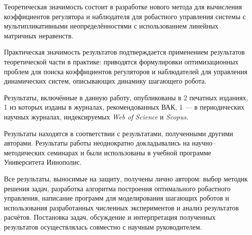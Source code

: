 {\influence} 

Теоретическая значимость состоит в разработке нового метода для вычисления коэффициентов регулятора и наблюдателя для робастного управления системы с мультипликативными неопределённостями с использованием линейных матричных неравенств.

Практическая значимость результатов подтверждается применением результатов теоретической части в практике: приводятся формулировки оптимизационных проблем для поиска коэффициентов регуляторов и наблюдателей для управления динамических систем, описывающих динамику шагающего робота. 

{\reliability} 
Результаты, включённые в данную работу, опубликованы в 2 печатных изданиях, 1 из которых изданы в журналах, рекомендованных ВАК, 1 --- в периодических научных журналах, индексируемых \textit{Web of Science} и \textit{Scopus}. 

Результаты находятся в соответствии с результатами, полученными другими авторами. Результаты работы неоднократно докладывались на научно--методических семинарах и были использованы в учебной программе Университета Иннополис.

{\contribution} 

Все результаты, выносимые на защиту, получены лично автором: выбор методик решения задач, разработка алгоритма построения оптимального робастного управления, написание программ для моделирования шагающих роботов и использования разработанных численных экспериментов и анализ результатов расчётов. Постановка задач, обсуждение и интерпретация полученных результатов осуществлялась совместно с научным руководителем.